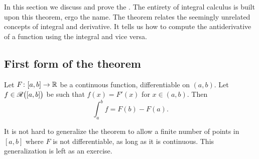 
In this section we discuss and prove the
\emph{}.
The entirety of integral calculus is built upon this theorem,
ergo the name.
The theorem relates the seemingly unrelated concepts of integral and
derivative.  It tells us how to compute the antiderivative of a function
using the integral and vice versa.

\subsection{First form of the theorem}

\begin{thm} \label{thm:FTCv1}
Let $F \colon [a,b] \to {\mathbb{R}}$ be a continuous function, differentiable
on $(a,b)$.  Let $f \in {\mathscr{R}}\bigl([a,b]\bigr)$ be such that $f(x) = F'(x)$ for $x \in
(a,b)$.  Then
\begin{equation*}
\int_a^b f = F(b)-F(a) .
\end{equation*}
\end{thm}

It is not hard to generalize the theorem to allow a finite number of points
in $[a,b]$ where $F$ is not differentiable, as long as it is continuous.
This generalization is left as an exercise.

